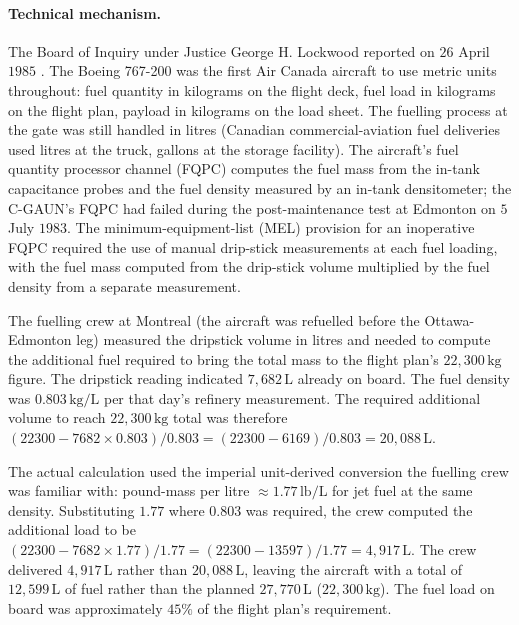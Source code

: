 \paragraph{Technical mechanism.} The Board of Inquiry under
Justice George H. Lockwood reported on $26$ April $1985$
\cite{acc:lockwood-gimli1985}. The Boeing 767-200 was the first
Air Canada aircraft to use metric units throughout: fuel
quantity in kilograms on the flight deck, fuel load in kilograms
on the flight plan, payload in kilograms on the load sheet. The
fuelling process at the gate was still handled in litres
(Canadian commercial-aviation fuel deliveries used litres at the
truck, gallons at the storage facility). The aircraft's fuel
quantity processor channel (FQPC) computes the fuel mass from the
in-tank capacitance probes and the fuel density measured by an
in-tank densitometer; the C-GAUN's FQPC had failed during the
post-maintenance test at Edmonton on $5$ July $1983$. The
minimum-equipment-list (MEL) provision for an inoperative FQPC
required the use of manual drip-stick measurements at each fuel
loading, with the fuel mass computed from the drip-stick volume
multiplied by the fuel density from a separate measurement.

The fuelling crew at Montreal (the aircraft was refuelled before
the Ottawa-Edmonton leg) measured the dripstick volume in litres
and needed to compute the additional fuel required to bring the
total mass to the flight plan's $22{,}300\,\si{\kilo\gram}$ figure.
The dripstick reading indicated $7{,}682\,\si{\liter}$ already on
board. The fuel density was $0.803\,\si{\kilo\gram\per\liter}$ per
that day's refinery measurement. The required additional volume
to reach $22{,}300\,\si{\kilo\gram}$ total was therefore $(22300 -
7682 \times 0.803)/0.803 = (22300 - 6169)/0.803 = 20{,}088\,\si{
\liter}$.

The actual calculation used the imperial unit-derived conversion
the fuelling crew was familiar with: pound-mass per litre
$\approx 1.77\,\text{lb/L}$ for jet fuel at the same density.
Substituting $1.77$ where $0.803$ was required, the crew
computed the additional load to be $(22300 - 7682 \times 1.77)/
1.77 = (22300 - 13597)/1.77 = 4{,}917\,\si{\liter}$. The crew
delivered $4{,}917\,\si{\liter}$ rather than $20{,}088\,\si{
\liter}$, leaving the aircraft with a total of $12{,}599\,\si{
\liter}$ of fuel rather than the planned $27{,}770\,\si{\liter}$
($22{,}300\,\si{\kilo\gram}$). The fuel load on board was
approximately $45\%$ of the flight plan's requirement.

